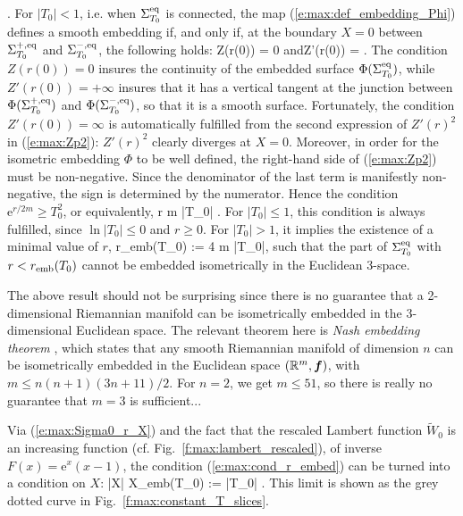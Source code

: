      .
\ee
For $|T_0|<1$, i.e. when $\Sigma_{T_0}^{\rm eq}$ is connected, the
map (\ref{e:max:def_embedding_Phi}) defines a smooth embedding if, and only
if, at the boundary $X=0$ between $\Sigma_{T_0}^{+,\rm eq}$ and
$\Sigma_{T_0}^{-,\rm eq}$, the following holds:
\be
    Z(r(0)) = 0 \quad\mbox{and}\quad Z'(r(0)) = \infty .
\ee
The condition $Z(r(0)) = 0$ insures the continuity of the embedded surface
$\Phi(\Sigma_{T_0}^{\rm eq})$,
while $Z'(r(0)) = +\infty$ insures that it has a vertical tangent at
the junction between $\Phi(\Sigma_{T_0}^{+,\rm eq})$ and
$\Phi(\Sigma_{T_0}^{-,\rm eq})$, so that it is
a smooth surface. Fortunately, the condition $Z'(r(0)) = \infty$
is automatically fulfilled from the second expression of
$Z'(r)^2$ in (\ref{e:max:Zp2}): $Z'(r)^2$ clearly diverges at $X=0$.
Moreover, in order for the isometric embedding $\Phi$ to be well defined, the right-hand side
of (\ref{e:max:Zp2}) must be non-negative. Since the denominator of the last
term is manifestly non-negative, the sign is determined by the numerator. Hence
the condition $\mathrm{e}^{r/2m} \geq T_0^2$, or equivalently,
\be \label{e:max:cond_r_embed}
    r  m \ln |T_0| .
\ee
For $|T_0|\leq 1$, this condition is always fulfilled, since $\ln |T_0| \leq 0$
and $r \geq 0$. For $|T_0| > 1$, it implies the existence of a minimal value
of $r$,
\be
    r_{\rm emb}(T_0) :=  4 m \ln |T_0|,
\ee
such that the part of $\Sigma_{T_0}^{\rm eq}$ with $r< r_{\rm emb}(T_0)$
cannot be embedded isometrically in the Euclidean 3-space.
\begin{remark}
The above result should not be surprising since there is
no guarantee that a 2-dimensional Riemannian manifold can
be isometrically embedded in the 3-dimensional Euclidean space.
The relevant theorem here is \emph{Nash embedding theorem} \cite{Nash56}, which
states that any smooth Riemannian manifold of dimension $n$ can be isometrically
embedded in the Euclidean space $(\mathbb{R}^m,\bm{f})$, with $m \leq n(n+1)(3n+11)/2$.
For $n=2$, we get $m\leq 51$, so there is really no guarantee that $m=3$
is sufficient...
\end{remark}

Via (\ref{e:max:Sigma0_r_X}) and the fact that the rescaled Lambert function
$\tilde{W}_0$ is an increasing function (cf. Fig.~\ref{f:max:lambert_rescaled}), of inverse $F(x)=\mathrm{e}^x(x-1)$,
the condition (\ref{e:max:cond_r_embed}) can be turned into a condition
on $X$:
\be
    |X| \geq X_{\rm emb}(T_0) := |T_0|  .
\ee
This limit is shown as the grey dotted curve in Fig.~\ref{f:max:constant_T_slices}.

